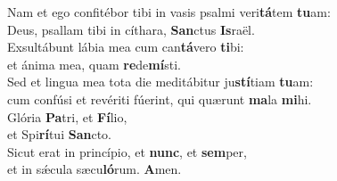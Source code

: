 \evenverse Nam et ego confitébor tibi in vasis psalmi veri\textbf{tá}tem \textbf{tu}am:~\*\\
\evenverse Deus, psallam tibi in cíthara, \textbf{San}ctus \textbf{Is}raël.\\
\oddverse Exsultábunt lábia mea cum can\textbf{tá}vero \textbf{ti}bi:~\*\\
\oddverse et ánima mea, quam \textbf{re}de\textbf{mí}sti.\\
\evenverse Sed et lingua mea tota die meditábitur ju\textbf{stí}tiam \textbf{tu}am:~\*\\
\evenverse cum confúsi et revériti fúerint, qui quærunt \textbf{ma}la \textbf{mi}hi.\\
\oddverse Glória \textbf{Pa}tri, et \textbf{Fí}lio,~\*\\
\oddverse et Spi\textbf{rí}tui \textbf{San}cto.\\
\evenverse Sicut erat in princípio, et \textbf{nunc}, et \textbf{sem}per,~\*\\
\evenverse et in sǽcula sæcu\textbf{ló}rum. \textbf{A}men.\\
